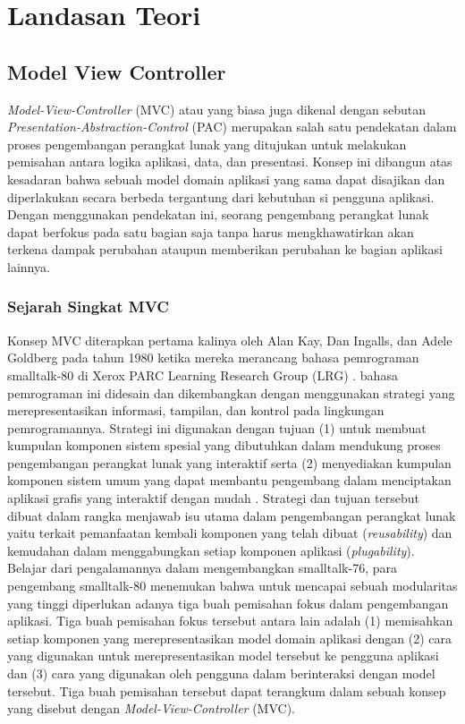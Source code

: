 \chapter{Landasan Teori}

\section{Model View Controller}
\noindent
\textit{Model-View-Controller} (MVC) atau yang biasa juga dikenal dengan sebutan \textit{Presentation-Abstraction-Control} (PAC) merupakan salah satu pendekatan dalam proses pengembangan perangkat lunak yang ditujukan untuk melakukan pemisahan antara logika aplikasi, data, dan presentasi. Konsep ini dibangun atas kesadaran bahwa sebuah model domain aplikasi yang sama dapat disajikan dan diperlakukan secara berbeda tergantung dari kebutuhan si pengguna aplikasi. Dengan menggunakan pendekatan ini, seorang pengembang perangkat lunak dapat berfokus pada satu bagian saja tanpa harus mengkhawatirkan akan terkena dampak perubahan ataupun memberikan perubahan ke bagian aplikasi lainnya.

\subsection{Sejarah Singkat MVC}
\noindent
Konsep MVC diterapkan pertama kalinya oleh Alan Kay, Dan Ingalls, dan Adele Goldberg pada tahun 1980 ketika mereka merancang bahasa pemrograman smalltalk-80 di Xerox PARC Learning Research Group (LRG) \citep{krasner1988desc}. bahasa pemrograman ini didesain dan dikembangkan dengan menggunakan strategi yang merepresentasikan informasi, tampilan, dan kontrol pada lingkungan pemrogramannya. Strategi ini digunakan dengan tujuan (1) untuk membuat kumpulan komponen sistem spesial yang dibutuhkan dalam mendukung proses pengembangan perangkat lunak yang interaktif serta (2) menyediakan kumpulan komponen sistem umum yang dapat membantu pengembang dalam menciptakan aplikasi grafis yang interaktif dengan mudah \citep{krasner1988desc}. Strategi dan tujuan tersebut dibuat dalam rangka menjawab isu utama dalam pengembangan perangkat lunak yaitu terkait pemanfaatan kembali komponen yang telah dibuat (\textit{reusability}) dan kemudahan dalam menggabungkan setiap komponen aplikasi (\textit{plugability}). \\

\noindent
Belajar dari pengalamannya dalam mengembangkan smalltalk-76, para pengembang smalltalk-80 menemukan bahwa untuk mencapai sebuah modularitas yang tinggi diperlukan adanya tiga buah pemisahan fokus dalam pengembangan aplikasi. Tiga buah pemisahan fokus tersebut antara lain adalah (1) memisahkan setiap komponen yang merepresentasikan model domain aplikasi dengan (2) cara yang digunakan untuk merepresentasikan model tersebut ke pengguna aplikasi dan (3) cara yang digunakan oleh pengguna dalam berinteraksi dengan model tersebut. Tiga buah pemisahan tersebut dapat terangkum dalam sebuah konsep yang disebut dengan \textit{Model-View-Controller} (MVC).

